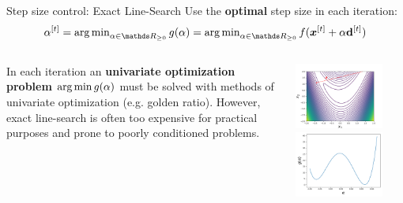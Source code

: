 \documentclass[11pt,compress,t,notes=noshow, xcolor=table]{beamer}
\begin{document}
	\begin{vbframe}{Step size control: Exact Line-Search}
		Use the \textbf{optimal} step size in each iteration:
		\vspace*{-0.1cm}
		$$ \alpha^{[t]} = \argmin_{\alpha \in \R_{\ge 0}} g(\alpha) = \argmin_{\alpha \in \R_{\ge 0}} f(\bm{x}^{[t]} + \alpha \mathbf{d}^{[t]})$$
		\begin{columns}
			\begin{column}{0.48\textwidth}
				
				\vspace*{-0.2cm}
				In each iteration an \textbf{univariate optimization problem} $\operatorname{arg\,min} g(\alpha)$ must be solved with methods of univariate optimization (e.g. golden ratio). However, exact line-search is often too expensive for practical purposes and prone to poorly conditioned problems.
			\end{column}
			\begin{column}{0.48\textwidth}
				\vspace*{-1cm}
				\begin{center}
					\includegraphics[width = 0.8\textwidth]{figure_man/line_search_rosenbrock.png} \\
					\includegraphics[width = 0.8\textwidth]{figure_man/line_search_rosenbrock_alpha.png}
				\end{center}
			\end{column}
		\end{columns}
	\end{vbframe}
	
\end{document}
